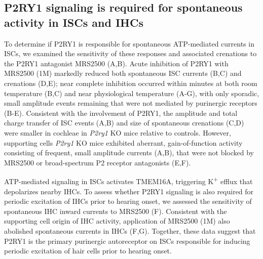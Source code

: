 \documentclass[9pt,lineno]{elife}
\begin{document}
\subsection{P2RY1 signaling is required for spontaneous activity in ISCs and IHCs}
To determine if P2RY1 is responsible for spontaneous ATP-mediated currents in ISCs, we examined the sensitivity of these responses and associated crenations to the P2RY1 antagonist MRS2500 (A,B). Acute inhibition of P2RY1 with MRS2500 (1\textmu M) markedly reduced both spontaneous ISC currents (B,C) and crenations (D,E); near complete inhibition occurred within minutes at both room temperature (B,C) and near physiological temperature (A-G), with only sporadic, small amplitude events remaining that were not mediated by purinergic receptors (B-E). Consistent with the involvement of P2RY1, the amplitude and total charge transfer of ISC events (A,B) and size of spontaneous crenations (C,D) were smaller in cochleae in \textit{P2ry1} KO mice relative to controls. However, supporting cells \textit{P2ry1} KO mice exhibited aberrant, gain-of-function activity consisting of frequent, small amplitude currents (A,B), that were not blocked by MRS2500 or broad-spectrum P2 receptor antagonists (E,F). 

ATP-mediated signaling in ISCs activates TMEM16A, triggering K\textsuperscript{+} efflux that depolarizes nearby IHCs. To assess whether P2RY1 signaling is also required for periodic excitation of IHCs prior to hearing onset, we assessed the sensitivity of spontaneous IHC inward currents to MRS2500 (F). Consistent with the supporting cell origin of IHC activity, application of MRS2500 (1\textmu M) also abolished spontaneous currents in IHCs (F,G). Together, these data suggest that P2RY1 is the primary purinergic autoreceptor on ISCs responsible for inducing periodic excitation of hair cells prior to hearing onset. 
\end{document}
